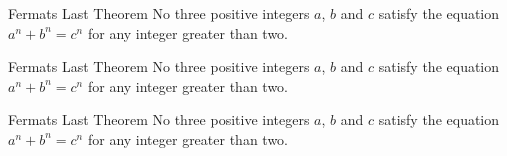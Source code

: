 \documentclass[11pt, letterpaper]{../exercise}
\begin{document}
    \begin{cbbhoney}{Fermats Last Theorem}
    No three positive integers \(a\), \(b\) and \(c\) satisfy the equation
    \(a^{n} + b^{n} = c^{n}\) for any integer greater than two.
    \end{cbbhoney}

    \begin{cbbpink}{Fermats Last Theorem}
    No three positive integers \(a\), \(b\) and \(c\) satisfy the equation
    \(a^{n} + b^{n} = c^{n}\) for any integer greater than two.
    \end{cbbpink}

    \begin{cbbpurple}{Fermats Last Theorem}
    No three positive integers \(a\), \(b\) and \(c\) satisfy the equation
    \(a^{n} + b^{n} = c^{n}\) for any integer greater than two.
    \end{cbbpurple}

\end{document}
